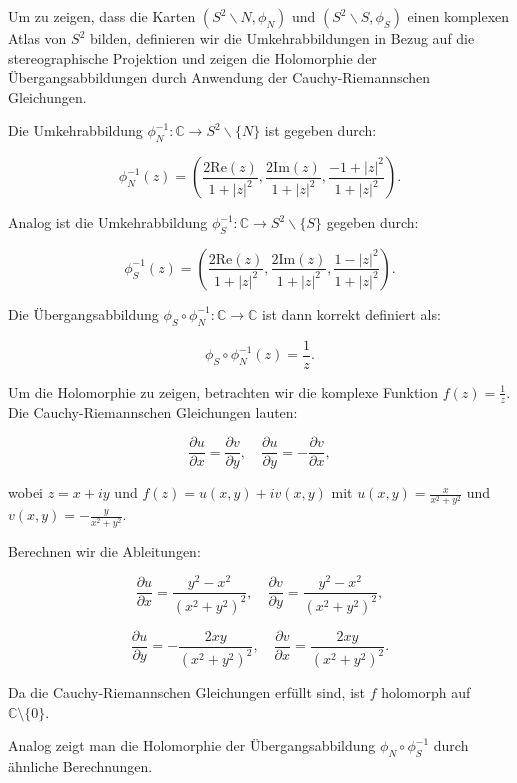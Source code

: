 Um zu zeigen, dass die Karten $\left(S^2 \backslash N, \phi_N\right)$ und $\left(S^2 \backslash S, \phi_S\right)$ einen komplexen Atlas von $S^2$ bilden, definieren wir die Umkehrabbildungen in Bezug auf die stereographische Projektion und zeigen die Holomorphie der Übergangsabbildungen durch Anwendung der Cauchy-Riemannschen Gleichungen.

Die Umkehrabbildung $\phi_N^{-1}: \mathbb{C} \to S^2 \backslash \{N\}$ ist gegeben durch:

\[
\phi_N^{-1}(z) = \left( \frac{2\text{Re}(z)}{1 + |z|^2}, \frac{2\text{Im}(z)}{1 + |z|^2}, \frac{-1 + |z|^2}{1 + |z|^2} \right).
\]

Analog ist die Umkehrabbildung $\phi_S^{-1}: \mathbb{C} \to S^2 \backslash \{S\}$ gegeben durch:

\[
\phi_S^{-1}(z) = \left( \frac{2\text{Re}(z)}{1 + |z|^2}, \frac{2\text{Im}(z)}{1 + |z|^2}, \frac{1 - |z|^2}{1 + |z|^2} \right).
\]

Die Übergangsabbildung $\phi_S \circ \phi_N^{-1}: \mathbb{C} \to \mathbb{C}$ ist dann korrekt definiert als:

\[
\phi_S \circ \phi_N^{-1}(z) = \frac{1}{z}.
\]

Um die Holomorphie zu zeigen, betrachten wir die komplexe Funktion $f(z) = \frac{1}{z}$. Die Cauchy-Riemannschen Gleichungen lauten:

\[
\frac{\partial u}{\partial x} = \frac{\partial v}{\partial y}, \quad \frac{\partial u}{\partial y} = -\frac{\partial v}{\partial x},
\]

wobei $z = x + iy$ und $f(z) = u(x, y) + iv(x, y)$ mit $u(x, y) = \frac{x}{x^2 + y^2}$ und $v(x, y) = -\frac{y}{x^2 + y^2}$.

Berechnen wir die Ableitungen:

\[
\frac{\partial u}{\partial x} = \frac{y^2 - x^2}{(x^2 + y^2)^2}, \quad \frac{\partial v}{\partial y} = \frac{y^2 - x^2}{(x^2 + y^2)^2},
\]

\[
\frac{\partial u}{\partial y} = -\frac{2xy}{(x^2 + y^2)^2}, \quad \frac{\partial v}{\partial x} = \frac{2xy}{(x^2 + y^2)^2}.
\]

Da die Cauchy-Riemannschen Gleichungen erfüllt sind, ist $f$ holomorph auf $\mathbb{C} \setminus \{0\}$.

Analog zeigt man die Holomorphie der Übergangsabbildung $\phi_N \circ \phi_S^{-1}$ durch ähnliche Berechnungen.

